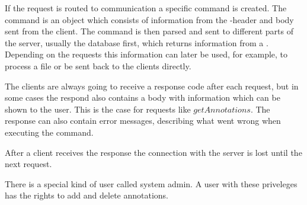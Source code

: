 If the request is routed to communication a specific command is
created. The command is an object which consists of information from
the -header and  body sent from the
client. The command is then parsed and sent to different parts of the
server, usually the database first, which returns information from a
. Depending on the requests this information can later
be used, for example, to process a file or be sent back to the clients
directly.

The clients are always going to receive a response code after each
request, but in some cases the respond also contains a 
body with information which can be shown to the user. This is the case
for requests like $getAnnotations$. The response can also contain
error messages, describing what went wrong when executing the command.

After a client receives the response the connection with the server is
lost until the next request.

There is a special kind of user called system admin. A user with these
priveleges has the rights to add and delete annotations.
